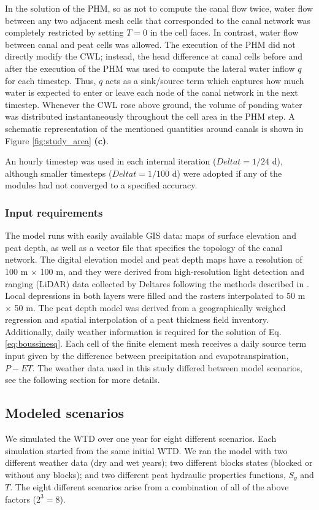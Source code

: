 \documentclass[bg, manuscript]{copernicus}
\begin{document}
In the solution of the PHM, so as not to compute the canal flow twice, water flow between any two adjacent mesh cells that corresponded to the canal network was completely restricted by setting $T=0$ in the cell faces.
In contrast, water flow between canal and peat cells was allowed. 
The execution of the PHM did not directly modify the CWL; instead, the head difference at canal cells before and after the execution of the PHM was used to compute the lateral water inflow $q$ for each timestep.
Thus, $q$ acts as a sink/source term which captures how much water is expected to enter or leave each node of the canal network in the next timestep.
Whenever the CWL rose above ground, the volume of ponding water was distributed instantaneously throughout the cell area in the PHM step.
A schematic representation of the mentioned quantities around canals is shown in Figure \ref{fig:study_area} \textbf{(c)}.

An hourly timestep was used in each internal iteration ($Delta t = 1/24$ \unit{d}), although smaller timesteps ($Delta t = 1/100$ \unit{d}) were adopted if any of the modules had not converged to a specified accuracy.

\subsubsection{Input requirements}
The model runs with easily available GIS data: maps of surface elevation and peat depth, as well as a vector file that specifies the topology of the canal network.
The digital elevation model and peat depth maps have a resolution of 100 \unit{m} $\times$ 100 \unit{m}, and they were derived from high-resolution light detection and ranging (LiDAR) data collected by Deltares following the methods described in \cite{vernimmenMappingDeepPeat2020}. 
Local depressions in both layers were filled and the rasters interpolated to 50 \unit{m} $\times$ 50 \unit{m}.
The peat depth model was derived from a geographically weighed regression and spatial interpolation of a peat thickness field inventory.
Additionally, daily weather information is required for the solution of Eq.\eqref{eq:boussinesq}.
Each cell of the finite element mesh receives a daily source term input given by  the difference between precipitation and evapotranspiration, $P -ET$.
The weather data used in this study differed between model scenarios, see the following section for more details.

\subsection{Modeled scenarios}
We simulated the WTD over one year for eight different scenarios.
Each simulation started from the same initial WTD.
We ran the model with two different weather data (dry and wet years); two different blocks states (blocked or without any blocks); and two different peat hydraulic properties functions, $S_y$ and $T$.
The eight different scenarios arise from a combination of all of the above factors ($2^3 = 8$).
\end{document}
